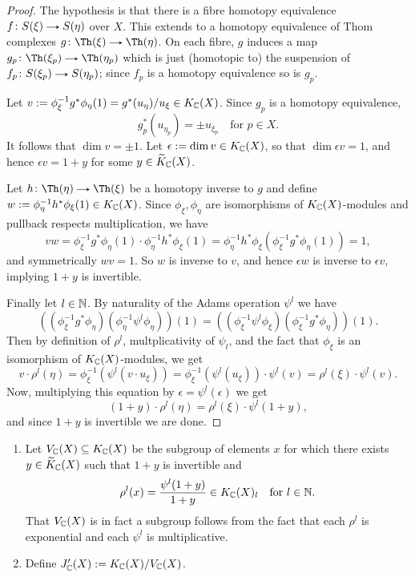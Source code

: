 \begin{proof}
  The hypothesis is that there is a fibre homotopy equivalence $f \c
  S(\xi) \to S(\eta)$ over $X$. This extends to a homotopy equivalence
  of Thom complexes $g \c \Th(\xi) \to \Th(\eta)$. On each fibre, $g$
  induces a map $g_p \c \Th(\xi_p) \to \Th(\eta_p)$ which is just
  (homotopic to) the suspension of $f_p \c S(\xi_p) \to S(\eta_p)$;
  since $f_p$ is a homotopy equivalence so is $g_p$.

  Let $v \mathrel{:=} \phi_\xi^{-1}g^*\phi_\eta(1) = g^*(u_\eta)/u_\xi \in
  K_{\mathbb{C}}(X)$. Since $g_p$ is a homotopy equivalence,
  \[
  g_p^*(u_{\eta_p}) = \pm u_{\xi_p} \quad \text{for }p \in X.
  \]
  It follows that $\dim v = \pm 1$. Let $\epsilon \mathrel{:=} \dim v \in
  K_{\mathbb{C}}(X)$, so that $\dim \epsilon v = 1$, and hence $\epsilon v = 1
  + y$ for some $y \in \widetilde K_{\mathbb{C}}(X)$.

  Let $h \c \Th(\eta) \to \Th(\xi)$ be a homotopy inverse to $g$ and
  define $w \mathrel{:=} \phi_\eta^{-1}h^*\phi_\xi(1) \in K_{\mathbb{C}}(X)$. Since
  $\phi_\xi,\phi_\eta$ are isomorphisms of $K_{\mathbb{C}}(X)$-modules and
  pullback respects multiplication, we have
  \[
  vw = \phi_\xi^{-1}g^*\phi_\eta(1) \cdot
  \phi_\eta^{-1}h^*\phi_\xi(1) =
  \phi_\eta^{-1}h^*\phi_\xi(\phi_\xi^{-1}g^*\phi_\eta(1)) = 1,
  \]
  and symmetrically $wv = 1$. So $w$ is inverse to $v$, and hence
  $\epsilon w$ is inverse to $\epsilon v$, implying $1+y$ is
  invertible.

  Finally let $l \in \mathbb{N}$. By naturality of the Adams operation
  $\psi^l$ we have
  \[
  ((\phi_\xi^{-1}g^*\phi_\eta)(\phi_\eta^{-1}\psi^l\phi_\eta))(1) =
  ((\phi_\xi^{-1}\psi^l\phi_\xi)(\phi_\xi^{-1}g^*\phi_\eta))(1).
  \]
  Then by definition of $\rho^l$, multplicativity of $\psi_l$, and the
  fact that $\phi_\xi$ is an isomorphism of $K_{\mathbb{C}}(X)$-modules, we get
  \[
  v \cdot \rho^l(\eta) = \phi_\xi^{-1}(\psi^l(v \cdot u_\xi)) =
  \phi_\xi^{-1}(\psi^l(u_\xi)) \cdot \psi^l(v) = \rho^l(\xi) \cdot
  \psi^l(v).
  \]
  Now, multiplying this equation by $\epsilon = \psi^l(\epsilon)$ we
  get
  \[
  (1+y) \cdot \rho^l(\eta) = \rho^l(\xi) \cdot \psi^l(1+y),
  \]
  and since $1+y$ is invertible we are done.
\end{proof}

\begin{definitions}
  \label{jprime}
  \begin{enumerate}[leftmargin=*]
  \item Let $V_{\mathbb{C}}(X) \subseteq K_{\mathbb{C}}(X)$ be the subgroup of elements
    $x$ for which there exists $y \in \widetilde K_{\mathbb{C}}(X)$ such that $1+y$ is
    invertible and
    \begin{equation}
      \label{jprime-y}
      \rho^l(x) = \frac{\psi^l(1+y)}{1+y} \in K_{\mathbb{C}}(X)_l \quad \text{for
      } l \in \mathbb{N}.
    \end{equation}
    That $V_{\mathbb{C}}(X)$ is in fact a subgroup
    follows from the fact that each $\rho^l$ is exponential and each
    $\psi^l$ is multiplicative.
  \item Define $J_{\mathbb{C}}'(X) \mathrel{:=} K_{\mathbb{C}}(X)/V_{\mathbb{C}}(X)$.
  \end{enumerate}
\end{definitions}

